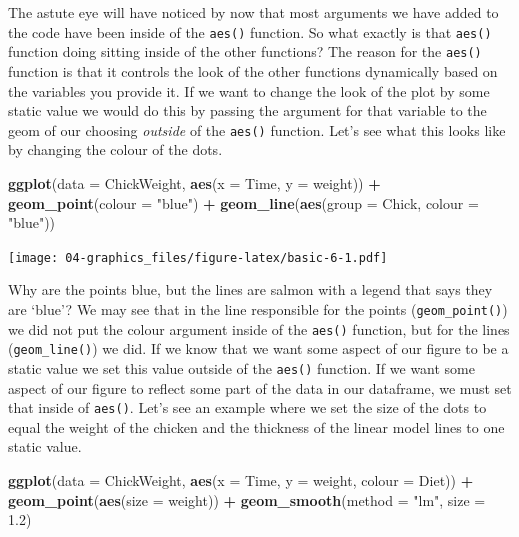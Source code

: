 \documentclass[]{book}
\newenvironment{Shaded}{\begin{snugshade}}{\end{snugshade}}
\newcommand{\KeywordTok}[1]{\textcolor[rgb]{0.13,0.29,0.53}{\textbf{#1}}}
\newcommand{\DataTypeTok}[1]{\textcolor[rgb]{0.13,0.29,0.53}{#1}}
\newcommand{\FloatTok}[1]{\textcolor[rgb]{0.00,0.00,0.81}{#1}}
\newcommand{\StringTok}[1]{\textcolor[rgb]{0.31,0.60,0.02}{#1}}
\newcommand{\OperatorTok}[1]{\textcolor[rgb]{0.81,0.36,0.00}{\textbf{#1}}}
\newcommand{\NormalTok}[1]{#1}
\theoremstyle{definition}
\theoremstyle{definition}
\theoremstyle{definition}
\theoremstyle{remark}
\begin{document}
The astute eye will have noticed by now that most arguments we have
added to the code have been inside of the \texttt{aes()} function. So
what exactly is that \texttt{aes()} function doing sitting inside of the
other functions? The reason for the \texttt{aes()} function is that it
controls the look of the other functions dynamically based on the
variables you provide it. If we want to change the look of the plot by
some static value we would do this by passing the argument for that
variable to the geom of our choosing \emph{outside} of the
\texttt{aes()} function. Let's see what this looks like by changing the
colour of the dots.

\begin{Shaded}
\begin{Highlighting}[]
\KeywordTok{ggplot}\NormalTok{(}\DataTypeTok{data =}\NormalTok{ ChickWeight, }\KeywordTok{aes}\NormalTok{(}\DataTypeTok{x =}\NormalTok{ Time, }\DataTypeTok{y =}\NormalTok{ weight)) }\OperatorTok{+}
\StringTok{  }\KeywordTok{geom_point}\NormalTok{(}\DataTypeTok{colour =} \StringTok{"blue"}\NormalTok{) }\OperatorTok{+}
\StringTok{  }\KeywordTok{geom_line}\NormalTok{(}\KeywordTok{aes}\NormalTok{(}\DataTypeTok{group =}\NormalTok{ Chick, }\DataTypeTok{colour =} \StringTok{"blue"}\NormalTok{))}
\end{Highlighting}
\end{Shaded}

\texttt{[image: 04-graphics\_files/figure-latex/basic-6-1.pdf]}

Why are the points blue, but the lines are salmon with a legend that
says they are `blue'? We may see that in the line responsible for the
points (\texttt{geom\_point()}) we did not put the colour argument
inside of the \texttt{aes()} function, but for the lines
(\texttt{geom\_line()}) we did. If we know that we want some aspect of
our figure to be a static value we set this value outside of the
\texttt{aes()} function. If we want some aspect of our figure to reflect
some part of the data in our dataframe, we must set that inside of
\texttt{aes()}. Let's see an example where we set the size of the dots
to equal the weight of the chicken and the thickness of the linear model
lines to one static value.

\begin{Shaded}
\begin{Highlighting}[]
\KeywordTok{ggplot}\NormalTok{(}\DataTypeTok{data =}\NormalTok{ ChickWeight, }\KeywordTok{aes}\NormalTok{(}\DataTypeTok{x =}\NormalTok{ Time, }\DataTypeTok{y =}\NormalTok{ weight, }\DataTypeTok{colour =}\NormalTok{ Diet)) }\OperatorTok{+}
\StringTok{  }\KeywordTok{geom_point}\NormalTok{(}\KeywordTok{aes}\NormalTok{(}\DataTypeTok{size =}\NormalTok{ weight)) }\OperatorTok{+}
\StringTok{  }\KeywordTok{geom_smooth}\NormalTok{(}\DataTypeTok{method =} \StringTok{"lm"}\NormalTok{, }\DataTypeTok{size =} \FloatTok{1.2}\NormalTok{)}
\end{Highlighting}
\end{Shaded}
\end{document}

